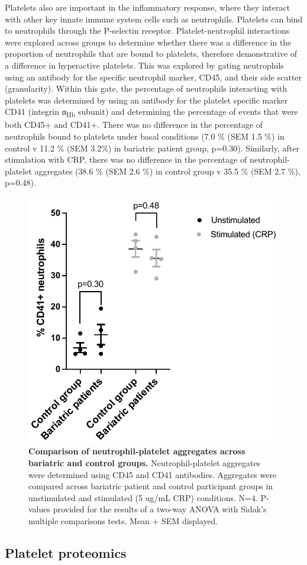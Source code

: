 \documentclass[11pt,twoside]{bristolthesis}
\begin{document}
Platelets also are important in the inflammatory response, where they interact with other key innate immune system cells such as neutrophils. Platelets can bind to neutrophils through the P-selectin receptor. Platelet-neutrophil interactions were explored across groups to determine whether there was a difference in the proportion of neutrophils that are bound to platelets, therefore demonstrative of a difference in hyperactive platelets. This was explored by gating neutrophils using an antibody for the specific neutrophil marker, CD45, and their side scatter (granularity). Within this gate, the percentage of neutrophils interacting with platelets was determined by using an antibody for the platelet specific marker CD41 (integrin α\textsubscript{IIb} subunit) and determining the percentage of events that were both CD45+ and CD41+. There was no difference in the percentage of neutrophils bound to platelets under basal conditions (7.0 \% (SEM 1.5 \%) in control v 11.2 \% (SEM 3.2\%) in bariatric patient group, p=0.30). Similarly, after stimulation with CRP, there was no difference in the percentage of neutrophil-platelet aggregates (38.6 \% (SEM 2.6 \%) in control group v 35.5 \% (SEM 2.7 \%), p=0.48).



\begin{figure}

{\centering \includegraphics[width=0.7\linewidth]{figure/Bariatric_study/Plt-neu_aggregates} 

}

\caption[Comparison of neutrophil-platelet aggregates across bariatric and control groups.]{\textbf{Comparison of neutrophil-platelet aggregates across bariatric and control groups.} Neutrophil-platelet aggregates were determined using CD45 and CD41 antibodies. Aggregates were compared across bariatric patient and control participant groups in unstimulated and stimulated (5 ug/mL CRP) conditions. N=4. P-values provided for the results of a two-way ANOVA with Sidak's multiple comparisons tests. Mean + SEM displayed.}\label{fig:platelet-neutrophil}
\end{figure}
\hypertarget{platelet-proteomics}{%
\subsection{Platelet proteomics}\label{platelet-proteomics}}
\end{document}
